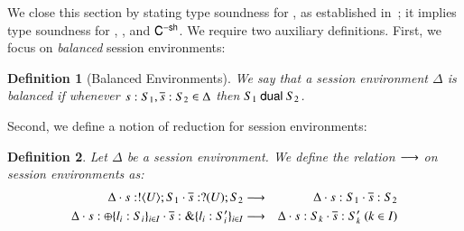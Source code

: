 \documentclass[preprint,11pt]{elsarticle}
\newtheorem{definition}{Definition}[section]
\begin{document}

We close this section  by stating  type soundness for \HOp, as established in~\cite{KouzapasPY17}; it implies 
type soundness for \HO, \sessp, and $\mathsf{C}^{-\mathsf{sh}}$. 
We require two auxiliary definitions. First, 
we focus on \emph{balanced} session environments: 


\begin{definition}[Balanced Environments]\label{d:wtenv}%
	We say that a session environment $\Delta$ is {\em balanced} if whenever
	$s: S_1, \overline{s}: S_2 \in \Delta$ then $S_1 \ \mathsf{dual}\  S_2$.
\end{definition}

Second, we define a notion of reduction for session environments:

\begin{definition}%
	\label{def:ses_red}
	Let $\Delta$ be a session environment.
	We define the relation $\longrightarrow$ on session environments as:
	\begin{eqnarray*}
			\Delta \cat s: \btout{U} S_1 \cat \dual{s}: \btinp{U} S_2 & \red &
			\Delta \cat s: S_1 \cat \dual{s}: S_2\\%
			\Delta \cat s: \btsel{l_i: S_i}_{i \in I} \cat \dual{s}: \btbra{l_i: S_i'}_{i \in I} &\red& 
			 \Delta \cat s: S_k \cat \dual{s}: S_k' \ (k \in I)
		\end{eqnarray*}
\end{definition}
\end{document}
